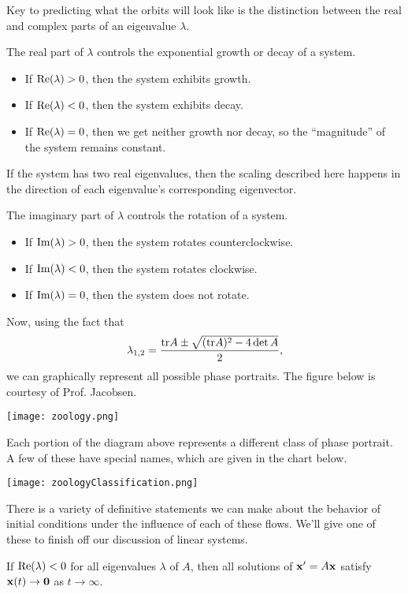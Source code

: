 \documentclass[../m082main.tex]{subfiles}
\begin{document}
Key to predicting what the orbits will look like is the distinction between the real and complex parts of an eigenvalue $\lambda$.

The real part of $\lambda$ controls the exponential growth or decay of a system.
\begin{itemize}
    \item If $\textrm{Re} (\lambda) > 0$, then the system exhibits growth.
    \item If $\textrm{Re} (\lambda) < 0$, then the system exhibits decay.
    \item If $\textrm{Re} (\lambda) = 0$, then we get neither growth nor decay, so the ``magnitude'' of the system remains constant.
\end{itemize}
If the system has two real eigenvalues, then the scaling described here happens in the direction of each eigenvalue's corresponding eigenvector.

The imaginary part of $\lambda$ controls the rotation of a system.
\begin{itemize}
    \item If $\textrm{Im} (\lambda) > 0$, then the system rotates counterclockwise.
    \item If $\textrm{Im} (\lambda) < 0$, then the system rotates clockwise.
    \item If $\textrm{Im} (\lambda) = 0$, then the system does not rotate.
\end{itemize}

Now, using the fact that
\[ \lambda_{1,2} = \frac{\textrm{tr} A \pm \sqrt{(\textrm{tr} A)^2 - 4 \det A}}{2}, \]
we can graphically represent all possible phase portraits.
The figure below is courtesy of Prof. Jacobsen.
\begin{center}
    \texttt{[image: zoology.png]}
\end{center}
Each portion of the diagram above represents a different class of phase portrait.
A few of these have special names, which are given in the chart below.
\begin{center}
    \texttt{[image: zoologyClassification.png]}
\end{center}

There is a variety of definitive statements we can make about the behavior of initial conditions under the influence of each of these flows.
We'll give one of these to finish off our discussion of linear systems.

\begin{theorem}
    If $\textrm{Re} (\lambda) < 0$ for all eigenvalues $\lambda$ of $A$, then all solutions of $\mathbf{x}' = A \mathbf{x}$ satisfy $\mathbf{x}(t) \to \mathbf{0}$ as $t \to \infty$.
\end{theorem}
\end{document}
